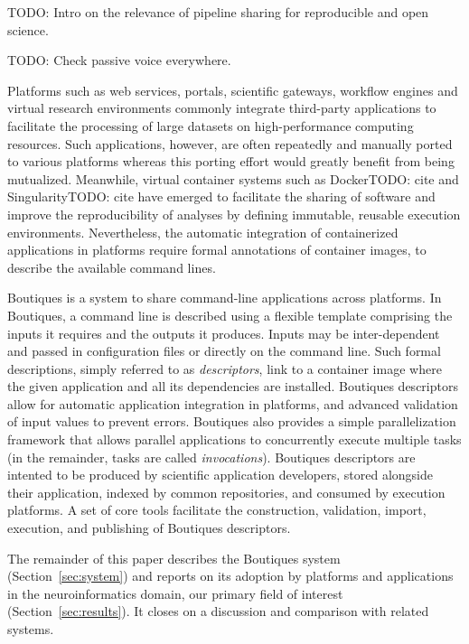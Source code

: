\documentclass[a4paper,num-refs]{oup-contemporary}
\newcommand{\note}[2]{\pdfmargincomment[color=yellow,author=#1,open=true]{#2}}
\newcommand{\todo}[1]{\color{red}TODO: #1\color{black}}
\newcommand{\boutiques}{Boutiques\xspace}
\begin{document}
\todo{Intro on the relevance of pipeline sharing for reproducible and open science.}

\todo{Check passive voice everywhere.}

Platforms such as web services, portals, scientific gateways, workflow
engines and virtual research environments commonly integrate
third-party applications to facilitate the processing of large
datasets on high-performance computing resources. Such applications,
however, are often repeatedly and manually ported to various platforms
whereas this porting effort would greatly benefit from being
mutualized. Meanwhile, virtual container systems such as Docker\todo{cite} and
Singularity\todo{cite} have emerged to facilitate the sharing of software and
improve the reproducibility of analyses by defining immutable,
reusable execution environments. Nevertheless, the automatic
integration of containerized applications in platforms require formal
annotations of container images, to describe the available command lines.

\boutiques is a system to share command-line applications across
platforms. In \boutiques, a command line is described using a flexible
template comprising the inputs it requires and the outputs it
produces. Inputs may be inter-dependent and passed in configuration
files or directly on the command line. Such formal descriptions,
simply referred to as \emph{descriptors}, link to a container image
where the given application and all its dependencies are
installed. \boutiques descriptors allow for automatic application
integration in platforms, and advanced validation of input values to
prevent errors. \boutiques also provides a simple parallelization
framework that allows parallel applications to concurrently execute
multiple tasks (in the remainder, tasks are called
\emph{invocations}). \boutiques descriptors are intented to be
produced by scientific application developers, stored alongside their
application, indexed by common repositories, and consumed by
execution platforms.  A set of core tools facilitate the construction,
validation, import, execution, and publishing of \boutiques
descriptors.


The remainder of this paper describes the \boutiques system
(Section~\ref{sec:system}) and reports on its adoption by platforms
and applications in the neuroinformatics domain, our primary field of
interest (Section~\ref{sec:results}). It closes on a discussion and
comparison with related systems.

\end{document}
